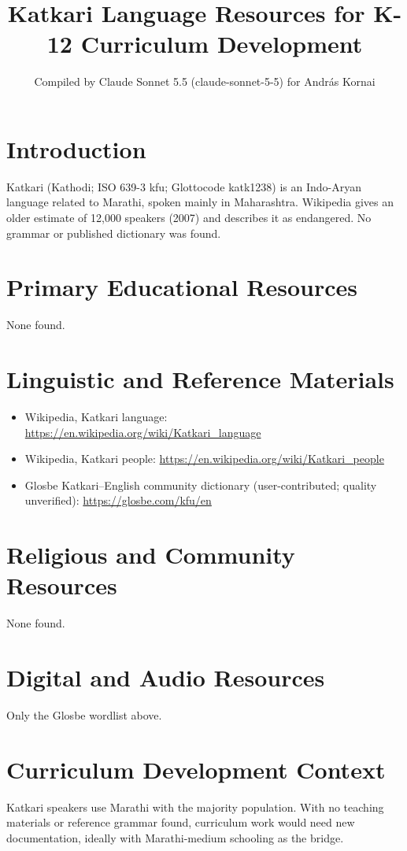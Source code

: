 \documentclass[12pt]{article}
\title{Katkari Language Resources for K-12 Curriculum Development}
\author{Compiled by Claude Sonnet 5.5 (claude-sonnet-5-5) for Andr\'as Kornai}
\date{}
\begin{document}
\maketitle

\section{Introduction}
Katkari (Kathodi; ISO 639-3 kfu; Glottocode katk1238) is an Indo-Aryan language related to Marathi, spoken mainly in Maharashtra. Wikipedia gives an older estimate of 12,000 speakers (2007) and describes it as endangered. No grammar or published dictionary was found.

\section{Primary Educational Resources}
None found.

\section{Linguistic and Reference Materials}
\begin{itemize}
\item Wikipedia, Katkari language: \url{https://en.wikipedia.org/wiki/Katkari_language}
\item Wikipedia, Katkari people: \url{https://en.wikipedia.org/wiki/Katkari_people}
\item Glosbe Katkari--English community dictionary (user-contributed; quality unverified): \url{https://glosbe.com/kfu/en}
\end{itemize}

\section{Religious and Community Resources}
None found.

\section{Digital and Audio Resources}
Only the Glosbe wordlist above.

\section{Curriculum Development Context}
Katkari speakers use Marathi with the majority population. With no teaching materials or reference grammar found, curriculum work would need new documentation, ideally with Marathi-medium schooling as the bridge.
\end{document}
